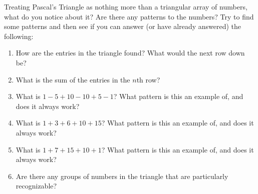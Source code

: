 \documentclass{book}
\begin{document}
\setcounter{project}{63}
\addtocounter{project}{-1}
\begin{activity}[]\label{activity-56}
\hypertarget{p-489}{}%
Treating Pascal's Triangle as nothing more than a triangular array of numbers, what do you notice about it?  Are there any patterns to the numbers? Try to find some patterns and then see if you can answer (or have already answered) the following:%
\begin{enumerate}[font=\bfseries,label=(\alph*),ref=\alph*]
\item\label{task-72} \hypertarget{p-490}{}%
How are the entries in the triangle found?  What would the next row down be?%
\item\label{task-73} \hypertarget{p-491}{}%
What is the sum of the entries in the \(n\)th row?%
\item\label{task-74} \hypertarget{p-492}{}%
What is \(1 - 5 + 10 - 10 + 5 - 1\)?  What pattern is this an example of, and does it always work?%
\item\label{task-75} \hypertarget{p-493}{}%
What is \(1 + 3 + 6 + 10 + 15\)?  What pattern is this an example of, and does it always work?%
\item\label{task-76} \hypertarget{p-494}{}%
What is \(1+ 7 + 15 + 10 + 1\)?  What pattern is this an example of, and does it always work?%
\item\label{task-77} \hypertarget{p-495}{}%
Are there any groups of numbers in the triangle that are particularly recognizable?%
\end{enumerate}
\end{activity}

\clearpage
\end{document}

